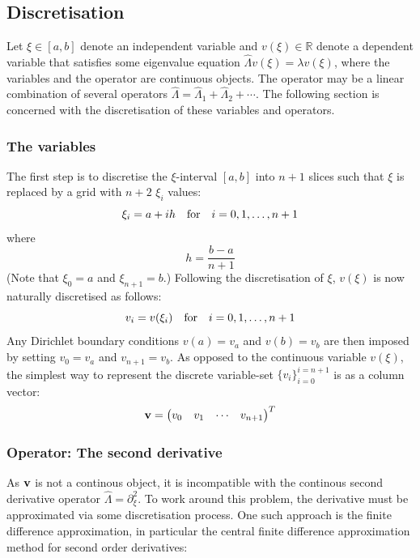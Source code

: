 \documentclass[reprint,english]{revtex4-1}
\begin{document}
\subsection{Discretisation}\label{sec:discretisation}
Let \(\xi\in[a,b]\) denote an independent variable and \(v(\xi)\in\mathbb{R}\) denote a dependent variable that satisfies some eigenvalue equation \(\hat{\Lambda} v(\xi)=\lambda v(\xi)\), where the variables and the operator are continuous objects. The operator may be a linear combination of several operators \(\hat{\Lambda}=\hat{\Lambda}_1+\hat{\Lambda}_2+\cdots\). The following section is concerned with the discretisation of these variables and operators.
\newpage
\subsubsection{The variables}
The first step is to discretise the \(\xi\)-interval \([a,b]\) into \(n+1\) slices such that \(\xi\) is replaced by a grid with \(n+2\) \(\xi_i\) values:
\begin{equation}
\xi_i=a+ih\qfor i=0,1,\ldots,n+1
\end{equation}
where
\begin{equation}
h=\frac{b-a}{n+1}
\end{equation}
(Note that \(\xi_0=a\) and \(\xi_{n+1}=b\).) Following the discretisation of \(\xi\), \(v(\xi)\) is now naturally discretised as follows:
\begin{equation}
v_i=v(\xi_i)\qfor i=0,1,\ldots,n+1
\end{equation}
Any Dirichlet boundary conditions \(v(a)=v_a\) and \(v(b)=v_b\) are then imposed by setting \(v_0=v_a\) and \(v_{n+1}=v_b\). As opposed to the continuous variable \(v(\xi)\), the simplest way to represent the discrete variable-set \(\{v_i\}_{i=0}^{i=n+1}\) is as a column vector:
\begin{equation}
\vb{v}=\mqty(v_0&v_1&\cdots&v_{n+1})^T
\end{equation}
\subsubsection{Operator: The second derivative}
As \(\vb{v}\) is not a continous object, it is incompatible with the continous second derivative operator \(\hat{\Lambda}=\partial_\xi^2\). To work around this problem, the derivative must be approximated via some discretisation process. One such approach is the finite difference approximation, in particular the central finite difference approximation method for second order derivatives:
\end{document}
